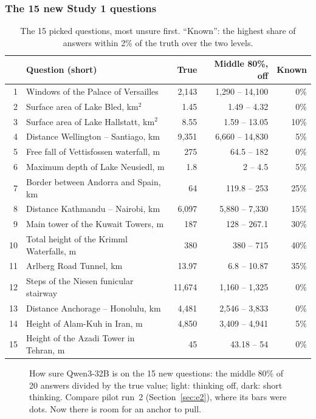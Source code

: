 \documentclass[11pt,a4paper]{article}
\begin{document}
\subsubsection{The 15 new Study 1 questions}

\begin{table}[ht]
\centering\small
\begin{tabular}{@{}rlrrr@{}}
\toprule
& Question (short) & True & Middle 80\%, off & Known \\
\midrule
1 & Windows of the Palace of Versailles & 2,143 & 1,290 -- 14,100 & 0\% \\
2 & Surface area of Lake Bled, km$^2$ & 1.45 & 1.49 -- 4.32 & 0\% \\
3 & Surface area of Lake Hallstatt, km$^2$ & 8.55 & 1.59 -- 13.05 & 10\% \\
4 & Distance Wellington -- Santiago, km & 9,351 & 6,660 -- 14,830 & 5\% \\
5 & Free fall of Vettisfossen waterfall, m & 275 & 64.5 -- 182 & 0\% \\
6 & Maximum depth of Lake Neusiedl, m & 1.8 & 2 -- 4.5 & 5\% \\
7 & Border between Andorra and Spain, km & 64 & 119.8 -- 253 & 25\% \\
8 & Distance Kathmandu -- Nairobi, km & 6,097 & 5,880 -- 7,330 & 15\% \\
9 & Main tower of the Kuwait Towers, m & 187 & 128 -- 267.1 & 30\% \\
10 & Total height of the Krimml Waterfalls, m & 380 & 380 -- 715 & 40\% \\
11 & Arlberg Road Tunnel, km & 13.97 & 6.8 -- 10.87 & 35\% \\
12 & Steps of the Niesen funicular stairway & 11,674 & 1,160 -- 1,325 & 0\% \\
13 & Distance Anchorage -- Honolulu, km & 4,481 & 2,546 -- 3,833 & 0\% \\
14 & Height of Alam-Kuh in Iran, m & 4,850 & 3,409 -- 4,941 & 5\% \\
15 & Height of the Azadi Tower in Tehran, m & 45 & 43.18 -- 54 & 0\% \\
\bottomrule
\end{tabular}
\caption{The 15 picked questions, most unsure first. \enquote{Known}: the highest share of answers within 2\% of the truth over the two levels.}
\end{table}

\begin{figure}[ht]
\centering{}
\caption{How sure Qwen3-32B is on the 15 new questions: the middle 80\% of 20 answers divided by the true value; light: thinking off, dark: short thinking. Compare pilot run~2 (Section~\ref{sec:e2}), where its bars were dots. Now there is room for an anchor to pull.}
\end{figure}
\end{document}
